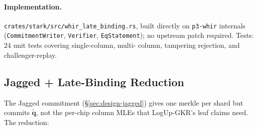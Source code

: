 \paragraph{Implementation.}
\texttt{crates/stark/src/whir\_late\_binding.rs}, built directly on
\texttt{p3-whir} internals (\texttt{CommitmentWriter},
\texttt{Verifier}, \texttt{EqStatement}); no upstream patch
required.  Tests: $24$ unit tests covering single-column, multi-
column, tampering rejection, and challenger-replay.

\subsection{Jagged + Late-Binding Reduction}
\label{sec:design-jagged-late-binding}
\label{sec:design-jagged-sumcheck}

The Jagged commitment (\S\ref{sec:design-jagged}) gives one merkle
per shard but commits $\widetilde{\mathbf{q}}$, not the per-chip
column MLEs that LogUp-GKR's leaf claims need.  The reduction:

